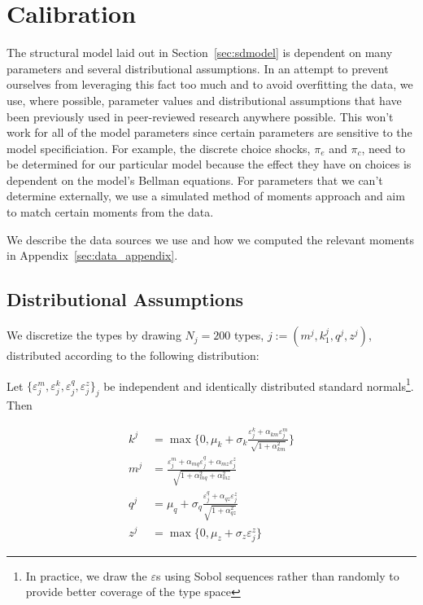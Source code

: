 
\section{Calibration} \label{sec:calibration}

The structural model laid out in Section~\ref{sec:sdmodel} is dependent on many parameters and several
distributional assumptions. In an attempt to prevent ourselves from leveraging this fact too much
and to avoid overfitting the data, we use, where possible, parameter values and distributional
assumptions that have been previously used in peer-reviewed research anywhere possible. This won't
work for all of the model parameters since certain parameters are sensitive to the model
specificiation. For example, the discrete choice shocks, $\pi_e$ and $\pi_c$, need to be determined
for our particular model because the effect they have on choices is dependent on the model's Bellman
equations. For parameters that we can't determine externally, we use a simulated method of moments
approach and aim to match certain moments from the data.

We describe the data sources we use and how we computed the relevant moments in
Appendix~\ref{sec:data_appendix}.


\subsection{Distributional Assumptions}

  We discretize the types by drawing $N_j=200$ types, $j := (m^j, k_1^j, q^j, z^j)$, distributed
  according to the following distribution:

  Let $\{ \varepsilon_j^m, \varepsilon_j^k, \varepsilon_j^q, \varepsilon_j^z \}_j$ be independent
  and identically distributed standard normals\footnote{In practice, we draw the $\varepsilon$s
  using Sobol sequences rather than randomly to provide better coverage of the type space}. Then

  \begin{align*}
    k^j &= \max \{0, \mu_k + \sigma_k \frac{\varepsilon_j^k + \alpha_{km} \varepsilon_j^m}{\sqrt{1 + \alpha_{km}^2}} \} \\
    m^j &= \frac{\varepsilon_j^m + \alpha_{mq} \varepsilon_j^q + \alpha_{mz} \varepsilon_j^z}{\sqrt{1 + \alpha_{mq}^2 + \alpha_{mz}^2}} \\
    q^j &= \mu_q + \sigma_q \frac{\varepsilon_j^q + \alpha_{qz} \varepsilon_j^z}{\sqrt{1 + \alpha_{qz}^2}} \\
    z^j &= \max \{0, \mu_z + \sigma_z \varepsilon_j^z \}
  \end{align*}

